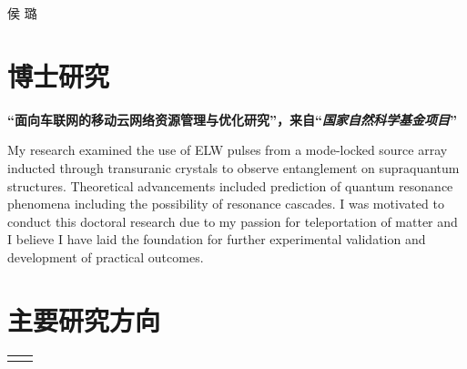 \documentclass[10pt]{article} %
\begin{document}
\begin{paracol}{2} %
	
	
	\parbox[top][0.12\textheight][c]{\linewidth}{ %
		\vspace{-0.04\textheight} %
		\centering %
		{\Huge 侯 璐}\faMars\\\medskip %
		{\Huge{}}
	}
	
	\section{博士研究}

	{\raggedright\textbf{``面向车联网的移动云网络资源管理与优化研究''，来自``\textit{国家自然科学基金项目}''}\\\medskip}
	
	My research examined the use of ELW pulses from a mode-locked source array inducted through transuranic crystals to observe entanglement on supraquantum structures. Theoretical advancements included prediction of quantum resonance phenomena including the possibility of resonance cascades. I was motivated to conduct this doctoral research due to my passion for teleportation of matter and I believe I have laid the foundation for further experimental validation and development of practical outcomes.
	
	\medskip %
	\section{主要研究方向}
	
	\begin{supertabular}{rl}
	\end{supertabular}

\end{paracol}
\end{document}
